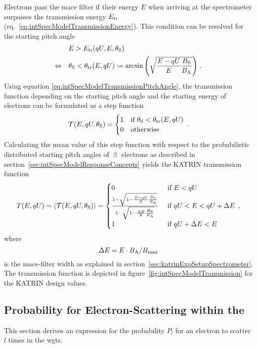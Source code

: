 Electrons pass the \gls{mace} filter if their energy $E$ when arriving at the spectrometer surpasses the transmission energy $E_\mathrm{tr}$ (eq.~\ref{eq:intSpecModelTransmissionEnergy}). This condition can be resolved for the starting pitch angle~\cite{Groh2015}
\begin{align}
&E > E_\mathrm{tr}(qU,E,\theta_\mathrm{S}) \nonumber \\
\Leftrightarrow \quad
& \theta_\mathrm{S} < \theta_\mathrm{tr}(E,qU)
\coloneqq
\arcsin
\left(\sqrt{
	\frac{E-qU}{E} 
	\frac{B_\mathrm{S}}{B_\mathrm{A}}
}\right)
\text{\,.}
\label{eq:intSpecModelTransmissionPitchAngle}
\end{align}
Using equation \eqref{eq:intSpecModelTransmissionPitchAngle}, the transmission function depending on the starting pitch angle and the starting energy of electrons can be formulated as a step function
\begin{equation}
\label{eq:intSpecModelTransmissionStep}
\mathcal{T}(E, qU, \theta_\mathrm{S}) =
\begin{cases}
1 & \text{if } \theta_\mathrm{S} < \theta_\mathrm{tr}(E,qU) \\
0 & \text{otherwise} 
\end{cases}
\text{\,.}
\end{equation}
Calculating the mean value of this step function with respect to the probabilistic distributed starting pitch angles of $\upbeta$ electrons as described in section~\ref{sec:intSpecModelResponseConcepts} yields the KATRIN transmission function~\cite{Angrik:2005ep}
\begin{equation}
\label{eq:intSpecModelTransmission}
	T(E, qU) = 
	\left\langle{\mathcal{T}(E, qU, \theta_\mathrm{S})}\right\rangle =
	\begin{cases}
	0 & \text{ if } E < qU \\
	\frac{
		1-\sqrt{
			1-\frac{E-qU}{E} 
			\frac{B_\mathrm{S}}{B_\mathrm{A}}
		} 
	}{
		1-\sqrt{1-\frac{\Delta E}{E}\frac{B_\mathrm{S}}{B_\mathrm{A}}}
	}
	& \text{ if } qU < E < qU + \Delta E \\
	1 & \text{ if } qU + \Delta E < E
	\end{cases}
	\text{\,,}
\end{equation}
where 
\begin{equation}
	\label{eq:intSpecModelTransmissionMACEFilterWidth}
	\Delta E=E\cdot B_\mathrm{A}/B_\mathrm{max}
\end{equation}
is the \gls{mace}-filter width as explained in section~\ref{sec:katrinExpSetupSpectrometer}. The transmission function is depicted in figure~\ref{fig:intSpecModelTransmission} for the KATRIN design values.

\subsection{Probability for Electron-Scattering within the }
\label{sec:intSpecModelResponseScattering}
This section derives an expression for the probability $P_l$ for an electron to scatter $l$ times in the \gls{wgts}.

